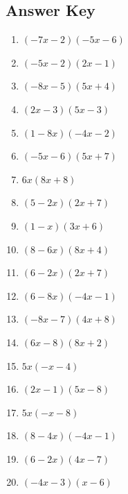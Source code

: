 \documentclass{article}
\begin{document}
\newpage

\subsection*{Answer Key}

\begin{enumerate}
\item $\displaystyle \left(- 7 x - 2\right) \left(- 5 x - 6\right) $ \ 
\item $\displaystyle \left(- 5 x - 2\right) \left(2 x - 1\right) $ \ 
\item $\displaystyle \left(- 8 x - 5\right) \left(5 x + 4\right) $ \ 
\item $\displaystyle \left(2 x - 3\right) \left(5 x - 3\right) $ \ 
\item $\displaystyle \left(1 - 8 x\right) \left(- 4 x - 2\right) $ \ 
\item $\displaystyle \left(- 5 x - 6\right) \left(5 x + 7\right) $ \ 
\item $\displaystyle 6 x \left(8 x + 8\right) $ \ 
\item $\displaystyle \left(5 - 2 x\right) \left(2 x + 7\right) $ \ 
\item $\displaystyle \left(1 - x\right) \left(3 x + 6\right) $ \ 
\item $\displaystyle \left(8 - 6 x\right) \left(8 x + 4\right) $ \ 
\item $\displaystyle \left(6 - 2 x\right) \left(2 x + 7\right) $ \ 
\item $\displaystyle \left(6 - 8 x\right) \left(- 4 x - 1\right) $ \ 
\item $\displaystyle \left(- 8 x - 7\right) \left(4 x + 8\right) $ \ 
\item $\displaystyle \left(6 x - 8\right) \left(8 x + 2\right) $ \ 
\item $\displaystyle 5 x \left(- x - 4\right) $ \ 
\item $\displaystyle \left(2 x - 1\right) \left(5 x - 8\right) $ \ 
\item $\displaystyle 5 x \left(- x - 8\right) $ \ 
\item $\displaystyle \left(8 - 4 x\right) \left(- 4 x - 1\right) $ \ 
\item $\displaystyle \left(6 - 2 x\right) \left(4 x - 7\right) $ \ 
\item $\displaystyle \left(- 4 x - 3\right) \left(x - 6\right) $ \ 

\end{enumerate}
\end{document}
